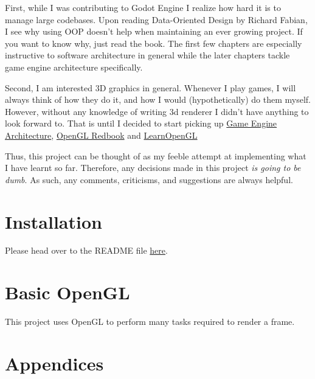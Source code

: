\documentclass[a4paper,14pt]{extbook}
\begin{document}
First, while I was contributing to Godot Engine I realize how hard it is to manage large codebases.
Upon reading Data-Oriented Design by Richard Fabian, I see why using OOP doesn't help when maintaining an ever growing project.
If you want to know why, just read the book.
The first few chapters are especially instructive to software architecture in general while the later chapters tackle game engine architecture specifically.

Second, I am interested 3D graphics in general.
Whenever I play games, I will always think of how they do it, and how I would (hypothetically) do them myself.
However, without any knowledge of writing 3d renderer I didn't have anything to look forward to.
That is until I decided to start picking up \href{https://www.amazon.ca/Game-Engine-Architecture-Jason-Gregory/dp/1568814135}{Game Engine Architecture}, \href{https://www.cs.utexas.edu/users/fussell/courses/cs354/handouts/Addison.Wesley.OpenGL.Programming.Guide.8th.Edition.Mar.2013.ISBN.0321773039.pdf}{OpenGL Redbook} and \href{https://learnopengl.com}{LearnOpenGL}

Thus, this project can be thought of as my feeble attempt at implementing what I have learnt so far.
Therefore, any decisions made in this project \textit{is going to be dumb}.
As such, any comments, criticisms, and suggestions are always helpful.

\newpage
\section{Installation}

Please head over to the README file \href{run:./../README.md}{here}.

\newpage
\section{Basic OpenGL}

This project uses OpenGL to perform many tasks required to render a frame.

\section{Appendices}
\end{document}
